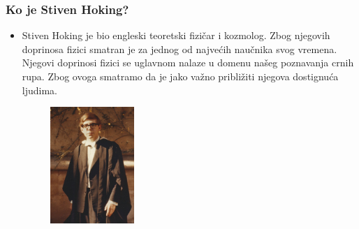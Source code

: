 \documentclass{beamer}
\begin{document}
\begin{frame}[fragile]\frametitle{Ko je Stiven Hoking?}
	\begin{itemize} \fontsize{9}{6}\selectfont	
		\item  Stiven Hoking je bio engleski teoretski fizičar i kozmolog. Zbog njegovih doprinosa fizici smatran je za jednog od najvećih naučnika svog vremena. Njegovi doprinosi fizici se uglavnom nalaze u domenu našeg poznavanja crnih rupa. Zbog ovoga smatramo da je jako važno približiti njegova dostignuća ljudima.
\begin{figure}[h!]
  \centering
  \includegraphics[width=0.3\textwidth]{Hoking,PreDijagnoze.jpg}
  \captionsetup{font=small}{Slika1: Hoking, na dodeli diploma 1960.}
  \label{fig:Hoking,PreDijagnoze}
  \end{figure}
	\end{itemize}
\end{frame}
\end{document}
